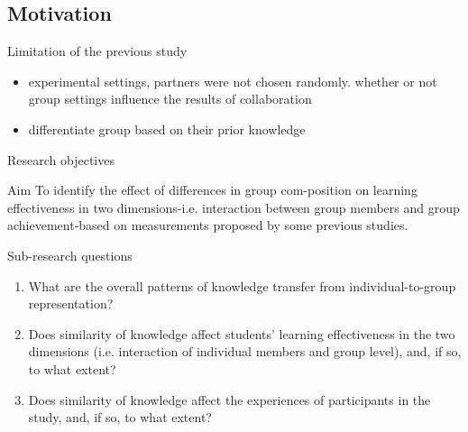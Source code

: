 \subsection{Motivation}
\begin{frame}{Limitation of the previous study}
    \begin{itemize}
        \item experimental settings, partners were not chosen randomly.
              whether or not group settings influence the
              results of collaboration
        \item differentiate group based on their prior knowledge
        
    \end{itemize}
\end{frame}
\begin{frame}{Research objectives}

\begin{block}{Aim}
    To identify the effect of differences in group com-position on learning effectiveness in two dimensions-i.e.  interaction between group  members  and  group  achievement-based  on  measurements  proposed by some previous studies.
\end{block}

\begin{alertblock}{Sub-research questions}
    \begin{enumerate}
    \item What are the overall patterns of knowledge transfer from individual-to-group representation?
    \item Does similarity of knowledge affect students' learning
    effectiveness in the two dimensions (i.e. interaction of individual 
    members and group level), and, if so, to what extent?
    \item Does similarity of knowledge affect the experiences of
    participants in the study, and, if so, to what extent?
\end{enumerate}
\end{alertblock}

\end{frame}

